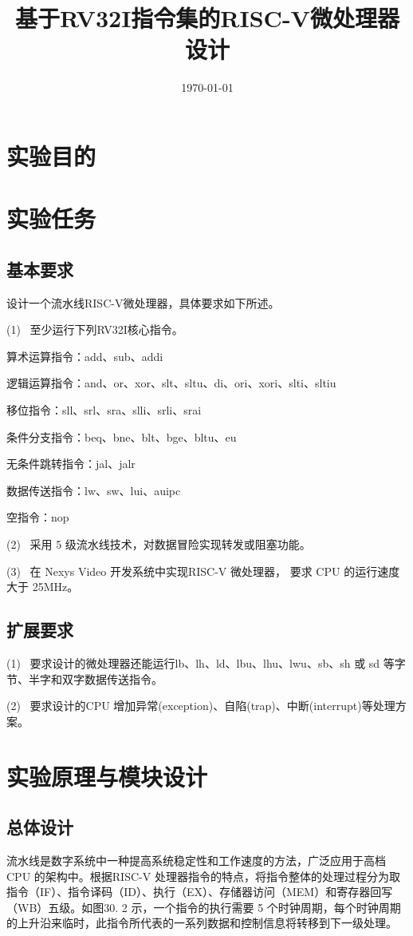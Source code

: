 \documentclass{../source/Experiment}
\title{基于RV32I指令集的RISC-V微处理器设计}
\date{\today}
\begin{document}
    \makecover
    \makeheader
    \section{实验目的}
    
    \section{实验任务}
        \subsection{基本要求}
        设计一个流水线RISC-V微处理器，具体要求如下所述。

        (1) \, 至少运行下列RV32I核心指令。

        算术运算指令：add、sub、addi

        逻辑运算指令：and、or、xor、slt、sltu、di、ori、xori、slti、sltiu

        移位指令：sll、srl、sra、slli、srli、srai

        条件分支指令：beq、bne、blt、bge、bltu、eu

        无条件跳转指令：jal、jalr

        数据传送指令：lw、sw、lui、auipc
    
        空指令：nop

        (2) \, 采用 5 级流水线技术，对数据冒险实现转发或阻塞功能。

        (3) \, 在 Nexys Video 开发系统中实现RISC-V 微处理器， 要求 CPU 的运行速度大于 25MHz。
        \subsection{扩展要求}
        (1) \, 要求设计的微处理器还能运行lb、lh、ld、lbu、lhu、lwu、sb、sh 或 sd 等字节、半字和双字数据传送指令。

        (2) \, 要求设计的CPU 增加异常(exception)、自陷(trap)、中断(interrupt)等处理方案。
        
    \section{实验原理与模块设计}
        \subsection{总体设计}
        流水线是数字系统中一种提高系统稳定性和工作速度的方法，广泛应用于高档CPU 的架构中。根据RISC-V 处理器指令的特点，将指令整体的处理过程分为取指令（IF）、指令译码（ID）、执行（EX）、存储器访问（MEM）和寄存器回写（WB）五级。如图30. 2 示，一个指令的执行需要 5 个时钟周期，每个时钟周期的上升沿来临时，此指令所代表的一系列数据和控制信息将转移到下一级处理。
\end{document}
